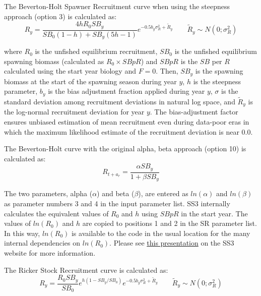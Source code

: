 \hypertarget{BH}{}
The Beverton-Holt Spawner Recruitment curve when using the steepness approach (option 3) is calculated as:
\begin{equation}{R_y = \frac{4hR_0SB_y}{SB_0(1-h)+SB_y(5h-1)}e^{-0.5b_y\sigma^2_R+\tilde{R}_y}\qquad  \tilde{R}_y\sim N(0;\sigma^2_R)}
\end{equation}

where $R_0$ is the unfished equilibrium recruitment, $SB_0$ is the unfished equilibrium spawning biomass (calculated as $R_0 \times SBpR$) and $SBpR$ is the $SB$ per $R$ calculated using the start year biology and $F = 0$. Then, $SB_y$ is the spawning biomass at the start of the spawning season during year $y$, $h$ is the steepness parameter, $b_y$ is the bias adjustment fraction applied during year $y$, $\sigma$ is the standard deviation among recruitment deviations in natural log space, and $\tilde{R}_y$ is the log-normal recruitment deviation for year $y$. The bias-adjustment factor \citep{methot-adjusting-2011} ensures unbiased estimation of mean recruitment even during data-poor eras in which the maximum likelihood estimate of the recruitment deviation is near 0.0.

\hypertarget{BH-ab}{}
The Beverton-Holt curve with the original alpha, beta approach (option 10) is calculated as:
\begin{equation}
	R_{t+a_{r}} = \frac{\alpha SB_{y}}{1+\beta SB_{y}}
\end{equation}

The two parameters, alpha ($\alpha$) and beta ($\beta$), are entered as $ln(\alpha)$ and $ln(\beta)$ as parameter numbers 3 and 4 in the input parameter list. SS3 internally calculates the equivalent values of $R_0$ and $h$ using $SBpR$ in the start year. The values of $ln(R_0)$ and $h$ are copied to positions 1 and 2 in the SR parameter list. In this way, $ln(R_0)$ is available to the code in the usual location for the many internal dependencies on $ln(R_0)$. Please see \href{https://nmfs-ost.github.io/ss3-website/qmds/webinars.html#Impact of time-varying biology on reference points in SS3}{this presentation} on the SS3 website for more information.

\hypertarget{Ricker}{}
The Ricker Stock Recruitment curve is calculated as:
\begin{equation}{R_y = \frac{R_0SB_y}{SB_0}e^{h(1-SB_y/SB_0)}e^{-0.5b_y\sigma^2_R+\tilde{R}_y}\qquad  \tilde{R}_y\sim N(0;\sigma^2_R)}
\end{equation}

